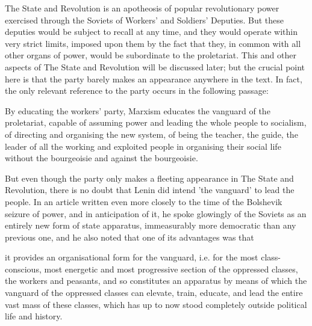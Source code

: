 The State and Revolution is an apotheosis of popular revolutionary power exercised through the Soviets of Workers' and Soldiers' Deputies. But these deputies would be subject to recall at any time, and they would operate within very strict limits, imposed upon them by the fact that they, in common with all other organs of power, would be subordinate to the proletariat. This and other aspects of The State and Revolution will be discussed later; but the crucial point here is that the party barely makes an appearance anywhere in the text. In fact, the only relevant reference to the party occurs in the following passage:
\begin{displayquote}
    By educating the workers' party, Marxism educates the vanguard of the proletariat, capable of assuming power and leading the whole people to socialism, of directing and organising the new system, of being the teacher, the guide, the leader of all the working and exploited people in organising their social life without the bourgeoisie and against the bourgeoisie.
\end{displayquote}

But even though the party only makes a fleeting appearance in The State and Revolution, there is no doubt that Lenin did intend 'the vanguard' to lead the people. In an article written even more closely to the time of the Bolshevik seizure of power, and in anticipation of it, he spoke glowingly of the Soviets as an entirely new form of state apparatus, immeasurably more democratic than any previous one, and he also noted that one of its advantages was that
\begin{displayquote}
    it provides an organisational form for the vanguard, i.e. for the most class-conscious, most energetic and most progressive section of the oppressed classes, the workers and peasants, and so constitutes an apparatus by means of which the vanguard of the oppressed classes can elevate, train, educate, and lead the entire vast mass of these classes, which has up to now stood completely outside political life and history.
\end{displayquote}

